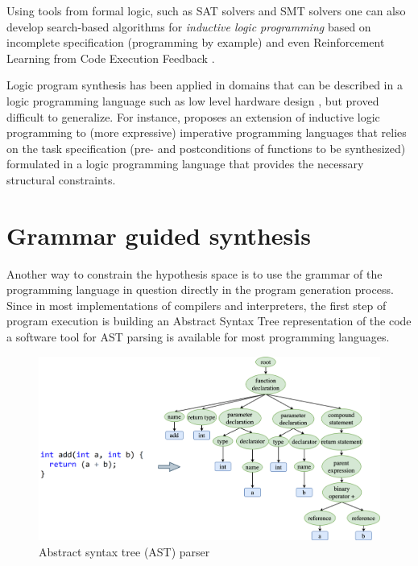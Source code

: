 Using tools from formal logic, such as SAT solvers \cite{gongSurveySATSolver2017} and SMT solvers \cite{reynoldsInductionSMTSolvers2015,bjornerSmtSolversFoundations2016} one can also develop search-based algorithms for \emph{inductive logic programming} \cite{cropperInductiveLogicProgramming2022, muggletonInductiveLogicProgramming1994} based on incomplete specification (programming by example) and even Reinforcement Learning from Code Execution Feedback \cite{caoGALOISBoostingDeep}.

Logic program synthesis has been applied in domains that can be described in a logic programming language such as low level hardware design \cite{siscoControlLogicSynthesis2024}, but proved difficult to generalize. 
For instance, \cite{polikarpovaStructuringSynthesisHeapmanipulating2019} proposes an extension of inductive logic programming to (more expressive) imperative programming languages that relies on the task specification (pre- and postconditions of functions to be synthesized) formulated in a logic programming language that provides the necessary structural constraints.

\newpage
\section{Grammar guided synthesis}
\label{sec:grammar-guided}

Another way to constrain the hypothesis space is to use the grammar of the programming language in question directly in the program generation process.
Since in most implementations of compilers and interpreters, the first step of program execution is building an Abstract Syntax Tree representation of the code a software tool for AST parsing is available for most programming languages.

\begin{figure}
    \centering
    \includegraphics[width=\linewidth]{images/ast.png}
    \caption{Abstract syntax tree (AST) parser}
    \label{fig:ast-parser}
\end{figure}

